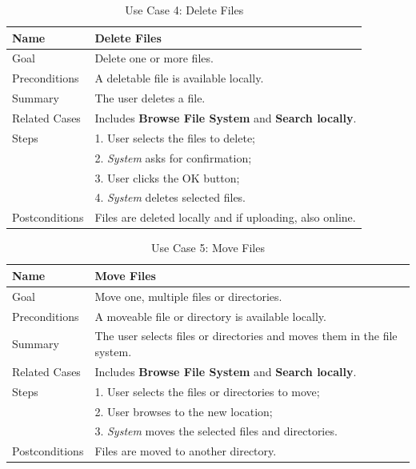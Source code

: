 \begin{table}[h!]
\centering
\begin{tabular}{|l|l|}
\hline
Name & Delete Files\\ \hline
Goal & Delete one or more files.\\ \hline
Preconditions & A deletable file is available locally. \\ \hline
Summary & The user deletes a file.\\ \hline
Related Cases & Includes \textbf{Browse File System} and \textbf{Search locally}. \\ \hline
Steps &  1. User selects the files to delete; \\
      &  2. \textit{System} asks for confirmation; \\ 
      &  3. User clicks the OK button; \\
      &  4. \textit{System} deletes selected files. 
        \\ \hline
Postconditions & Files are deleted locally and if uploading, also online.
\\ \hline
\end{tabular}
\caption{Use Case 4: Delete Files}
\label{tab:UC4}
\end{table}

\begin{table}[h!]
\centering
\begin{tabular}{|l|l|}
\hline
Name & Move Files\\ \hline
Goal & Move one, multiple files or directories.\\ \hline
Preconditions & A moveable file or directory is available locally. \\ \hline
Summary & The user selects files or directories and moves them in the file system.\\ \hline
Related Cases & Includes \textbf{Browse File System} and \textbf{Search locally}. \\ \hline
Steps &  1. User selects the files or directories to move; \\
      &  2. User browses to the new location; \\
      &  3. \textit{System} moves the selected files and directories. 
        \\ \hline
Postconditions & Files are moved to another directory.
\\ \hline
\end{tabular}
\caption{Use Case 5: Move Files}
\label{tab:UC5}
\end{table}

